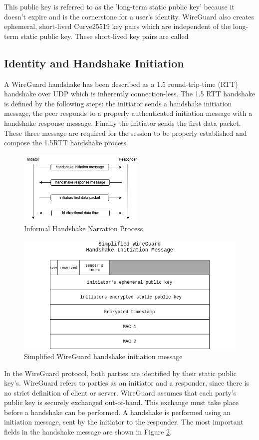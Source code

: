 \documentclass [11pt, proquest] {uwthesis}[2020/02/24]
\begin{document}
This public key is referred to as the 'long-term static public key' because it doesn't expire and is the cornerstone for a user's identity. WireGuard also creates ephemeral, short-lived Curve25519 key pairs which are independent of the long-term static public key. These short-lived key pairs are called 

\subsection {Identity and Handshake Initiation}

A WireGuard handshake has been described as a 1.5 round-trip-time (RTT) handshake over UDP which is inherently connection-less. The 1.5 RTT handshake is defined by the following steps: the initiator sends a handshake initiation message, the peer responds to a properly authenticated initiation message with a handshake response message. Finally the initiator sends the first data packet. These three message are required for the session to be properly established and compose the 1.5RTT handshake process.

\begin{figure}[ht]
\includegraphics[width=6cm]{paper/images/handshake_process.drawio.png}
\caption{Informal Handshake Narration Process}
\label{fig:handshake_process}
\end{figure}


\label{handshake_message}

\begin{figure}[ht]
\includegraphics[width=12cm]{paper/images/Wg_hand_init.drawio.png}
\caption{Simplified WireGuard handshake initiation message}
\label{fig:hand_init}
\end{figure}
In the WireGuard protocol, both parties are identified by their static public key's. WireGuard refers to parties as an initiator and a responder, since there is no strict definition of client or server. WireGuard assumes that each party's public key is securely exchanged out-of-band. This exchange must take place before a handshake can be performed. A handshake is performed using an initiation message, sent by the initiator to the responder. The most important fields in the handshake message are shown in Figure \ref{fig:hand_init}.
\end{document}
